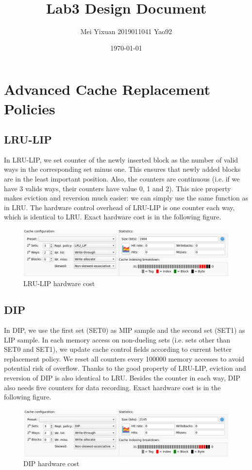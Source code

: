 \documentclass[utf8]{article}
\title{\bf\huge Lab3 Design Document}
\author{Mei Yixuan 2019011041 Yao92}
\date{\today}
\begin{document}
\maketitle

\section{Advanced Cache Replacement Policies}

\subsection{LRU-LIP}
In LRU-LIP, we set counter of the newly inserted block as the number of valid ways in the corresponding set minus one. This ensures that newly added blocks are in the least important position. Also, the counters are continuous (i.e. if we have 3 valids ways, their counters have value 0, 1 and 2). This nice property makes eviction and reversion much easier: we can simply use the same function as in LRU. The hardware control overhead of LRU-LIP is one counter each way, which is identical to LRU. Exact hardware cost is in the following figure.
\begin{figure}[h]
	\centering
	\includegraphics[width=0.7\linewidth]{screenshot001}
	\caption{LRU-LIP hardware cost}
	\label{fig:screenshot001}
\end{figure}


\subsection{DIP}
In DIP, we use the first set (SET0) as MIP sample and the second set (SET1) as LIP sample. In each memory access on non-dueling sets (i.e. sets other than SET0 and SET1), we update cache control fields according to current better replacement policy. We reset all counters every 100000 memory accesses to avoid potential risk of overflow. Thanks to the good property of LRU-LIP, eviction and reversion of DIP is also identical to LRU. Besides the counter in each way, DIP also needs five counters for data recording. Exact hardware cost is in the following figure.
\begin{figure}[h]
	\centering
	\includegraphics[width=0.7\linewidth]{screenshot002}
	\caption{DIP hardware cost}
	\label{fig:screenshot002}
\end{figure}
\newpage
\end{document}
